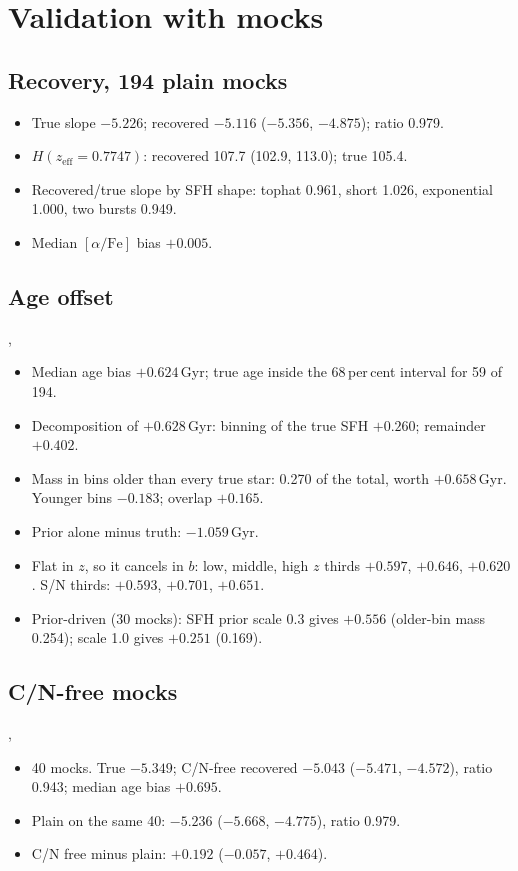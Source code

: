 \documentclass[fleqn,usenatbib]{mnras}
\newcommand{\zeff}{\ensuremath{z_\mathrm{eff}}}
\newcommand{\afe}{\ensuremath{[\alpha/\mathrm{Fe}]}}
\begin{document}
\section{Validation with mocks}
\label{sec:mocks}
\subsection{Recovery, 194 plain mocks}
\begin{itemize}
\item True slope $-5.226$; recovered $-5.116$ ($-5.356$, $-4.875$); ratio 0.979.
\item $H(\zeff=0.7747)$: recovered 107.7 (102.9, 113.0); true 105.4.
\item Recovered/true slope by SFH shape: tophat 0.961, short 1.026, exponential 1.000, two bursts 0.949.
\item Median \afe{} bias $+0.005$.
\end{itemize}

\subsection{Age offset}
, 
\begin{itemize}
\item Median age bias $+0.624$\,Gyr; true age inside the 68\,per\,cent interval for 59 of 194.
\item Decomposition of $+0.628$\,Gyr: binning of the true SFH $+0.260$; remainder $+0.402$.
\item Mass in bins older than every true star: 0.270 of the total, worth $+0.658$\,Gyr. Younger bins $-0.183$; overlap $+0.165$.
\item Prior alone minus truth: $-1.059$\,Gyr.
\item Flat in $z$, so it cancels in $b$: low, middle, high $z$ thirds $+0.597$, $+0.646$, $+0.620$. S/N thirds: $+0.593$, $+0.701$, $+0.651$.
\item Prior-driven (30 mocks): SFH prior scale 0.3 gives $+0.556$ (older-bin mass 0.254); scale 1.0 gives $+0.251$ (0.169).
\end{itemize}

\subsection{C/N-free mocks}
, 
\begin{itemize}
\item 40 mocks. True $-5.349$; C/N-free recovered $-5.043$ ($-5.471$, $-4.572$), ratio 0.943; median age bias $+0.695$.
\item Plain on the same 40: $-5.236$ ($-5.668$, $-4.775$), ratio 0.979.
\item C/N free minus plain: $+0.192$ ($-0.057$, $+0.464$).
\end{itemize}
\end{document}
